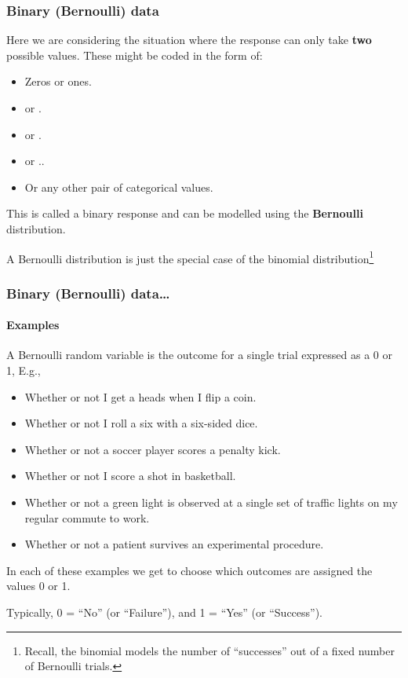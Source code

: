\documentclass{beamer}\usepackage[]{graphicx}\usepackage[]{xcolor}
\begin{document}
\begin{frame}
\frametitle{Binary (Bernoulli) data}
Here we are considering the situation where the response can only take \textbf{two} possible values. These might be coded in the form of:
\begin{itemize} \setlength{\itemsep}{2mm}
\item Zeros or ones. 
\item {} or . 
\item {} or .
\item {} or ..
\item Or any other pair of categorical values. 
\end{itemize}
\medskip

This is called a binary response and can be modelled using the \textbf{Bernoulli} distribution. 
\medskip

A Bernoulli distribution is just the special case of the binomial distribution\footnote{Recall, the binomial models the number of ``successes'' out of a fixed number of Bernoulli trials.} 
\end{frame}


\begin{frame}
\frametitle{Binary (Bernoulli) data\ldots}
\framesubtitle{Examples}
A Bernoulli random variable is the outcome for a single trial expressed as a 0 or 1, E.g.,
\medskip

\begin{itemize}
\item Whether or not I get a heads when I flip a coin.
\item Whether or not I roll a six with a six-sided dice.
\item Whether or not a soccer player scores a penalty kick.
\item Whether or not I score a shot in basketball.
\item Whether or not a green light is observed at a single set of traffic lights
on my regular commute to work.
\item Whether or not a patient survives an experimental procedure.
\end{itemize}
\medskip

In each of these examples we get to choose which outcomes are assigned the values 0 or 1.
\medskip

Typically, 0 = ``No'' (or ``Failure''), and 1 = ``Yes'' (or ``Success'').
\end{frame}
\end{document}
